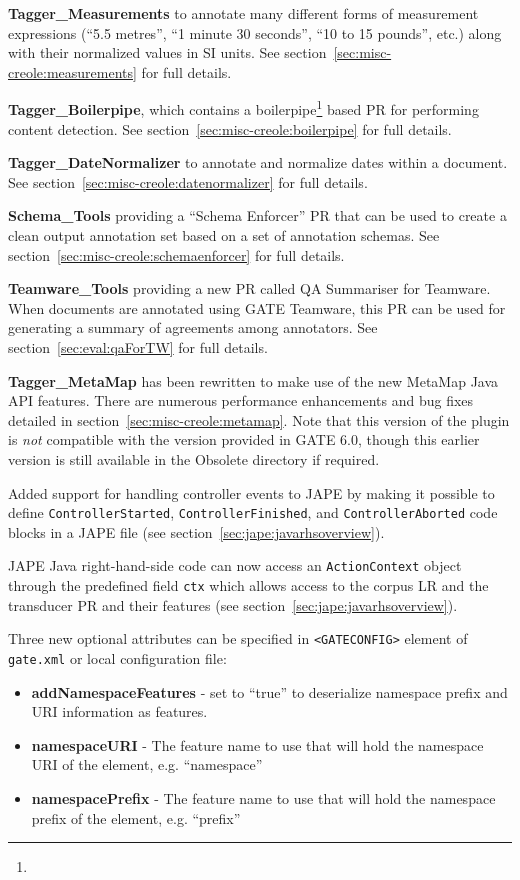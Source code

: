 \textbf{Tagger\_Measurements} to annotate many different forms of measurement
expressions (``5.5 metres'', ``1 minute 30 seconds'', ``10 to 15 pounds'',
etc.) along with their normalized values in SI units.  See
section~\ref{sec:misc-creole:measurements} for full details.

\textbf{Tagger\_Boilerpipe}, which contains a
boilerpipe\footnote{} based
PR for performing content detection. See
section~\ref{sec:misc-creole:boilerpipe} for full details.

\textbf{Tagger\_DateNormalizer} to annotate and normalize dates within a
document. See section~\ref{sec:misc-creole:datenormalizer} for full details.

\textbf{Schema\_Tools} providing a ``Schema Enforcer'' PR that can be used to
create a clean output annotation set based on a set of annotation schemas. See
section~\ref{sec:misc-creole:schemaenforcer} for full details.

\textbf{Teamware\_Tools} providing a new PR called QA Summariser for Teamware.
When documents are annotated using GATE Teamware, this PR can be used for
generating a summary of agreements among annotators.  See
section~\ref{sec:eval:qaForTW} for full details.

\textbf{Tagger\_MetaMap} has been rewritten to make use of the new MetaMap Java
API features.  There are numerous performance enhancements and bug fixes
detailed in section~\ref{sec:misc-creole:metamap}.  Note that this version of
the plugin is \emph{not} compatible with the version provided in GATE 6.0,
though this earlier version is still available in the Obsolete directory if
required.


Added support for handling controller events to JAPE by making it possible
to define \texttt{ControllerStarted}, \texttt{ControllerFinished}, and 
\texttt{ControllerAborted} code blocks in a JAPE file (see 
section~\ref{sec:jape:javarhsoverview}).

JAPE Java right-hand-side code can now access an \texttt{ActionContext} object
through the predefined field \texttt{ctx} which allows access to the corpus LR
and the transducer PR and their features (see
section~\ref{sec:jape:javarhsoverview}).

Three new optional attributes can be specified in {\tt<GATECONFIG>}
element of {\tt gate.xml} or local configuration file:

\begin{itemize}
\item \textbf{addNamespaceFeatures} - set to ``true'' to deserialize namespace prefix and URI information as features.
\item \textbf{namespaceURI} - The feature name to use that will hold the namespace URI of the element, e.g. ``namespace''
\item \textbf{namespacePrefix} - The feature name to use that will hold the namespace prefix of the element, e.g. ``prefix''
\end{itemize}

